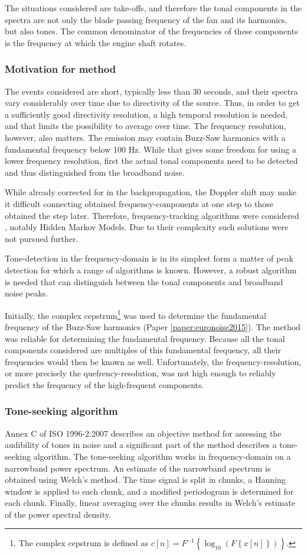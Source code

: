 The situations considered are take-offs, and therefore the tonal components in
the spectra are not only the blade passing frequency of the fan and its
harmonics, but also  tones. The common denominator of the
frequencies of these components is the frequency at which the engine shaft
rotates.

\subsubsection*{Motivation for method}
The events considered are short, typically less than 30 seconds, and their
spectra vary considerably over time due to directivity of the source. Thus, in
order to get a sufficiently good directivity resolution, a high temporal
resolution is needed, and that limits the possibility to average over time. The
frequency resolution, however, also matters. The emission may contain Buzz-Saw
harmonics with a fundamental frequency below 100 Hz. While that gives some
freedom for using a lower frequency resolution, first the actual tonal
components need to be detected and thus distinguished from the broadband noise.

While already corrected for in the backpropagation, the Doppler shift may make
it difficult connecting obtained frequency-components at one step to those
obtained the step later. Therefore, frequency-tracking algorithms were
considered \cite{Lampert2010}, notably Hidden Markov Models. Due to their
complexity such solutions were not pursued further.

Tone-detection in the frequency-domain is in its simplest form a matter of peak
detection for which a range of algorithms is known. However, a robust algorithm
is needed that can distinguish between the tonal components and broadband noise
peaks.

Initially, the complex cepstrum\footnote{The complex cepstrum is defined as
$c[n] = F^{-1}\left\{\log_{10}{\left( F \left\{x[n]\right\} \right)}\right\}$.}
was used to determine the fundamental frequency of the Buzz-Saw harmonics
(Paper \ref{paper:euronoise2015}). The method was reliable for determining the
fundamental frequency. Because all the tonal components considered are multiples
of this fundamental frequency, all their frequencies would then be known as
well. Unfortunately, the frequency-resolution, or more precisely the
quefrency-resolution, was not high enough to reliably predict the frequency of
the high-frequent components.

\subsubsection*{Tone-seeking algorithm}
Annex C of ISO 1996-2:2007 \cite{ISO1996-2_2007} describes an objective method
for assessing the audibility of tones in noise and a significant part of the
method describes a tone-seeking algorithm. The tone-seeking algorithm works in
frequency-domain on a narrowband power spectrum. An estimate of the narrowband
spectrum is obtained using Welch's method. The time signal is split in chunks, a
Hanning window is applied to each chunk, and a modified periodogram is determined for
each chunk. Finally, linear averaging over the chunks results in Welch's
estimate of the power spectral density.


